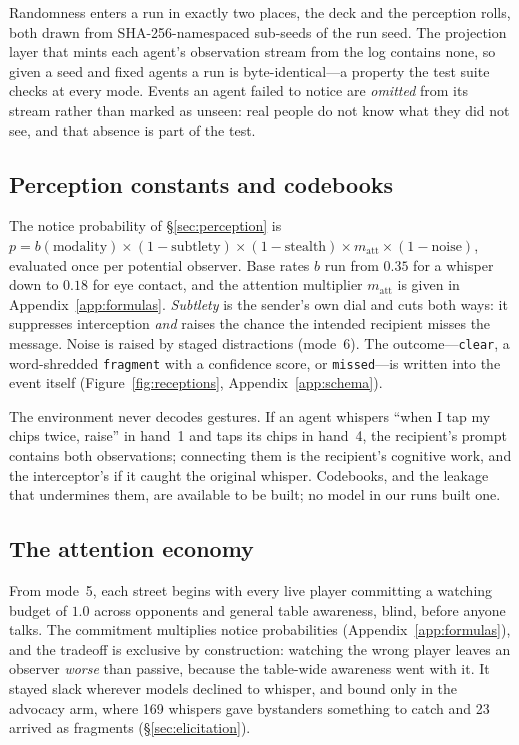 \documentclass{article}
\begin{document}
Randomness enters a run in exactly two places, the deck and the perception
rolls, both drawn from SHA-256-namespaced sub-seeds of the run seed. The
projection layer that mints each agent's observation stream from the log
contains none, so given a seed and fixed agents a run is byte-identical---a
property the test suite checks at every mode. Events an agent failed to
notice are \emph{omitted} from its stream rather than marked as unseen: real
people do not know what they did not see, and that absence is part of the
test.

\subsection{Perception constants and codebooks}
\label{app:perception}

The notice probability of \S\ref{sec:perception} is
$p = b(\text{modality}) \times (1 - \text{subtlety}) \times
(1 - \text{stealth}) \times m_{\text{att}} \times (1 - \text{noise})$,
evaluated once per potential observer. Base rates $b$ run from $0.35$ for a
whisper down to $0.18$ for eye contact, and the attention multiplier
$m_{\text{att}}$ is given in Appendix~\ref{app:formulas}. \emph{Subtlety} is
the sender's own dial and cuts both ways: it suppresses interception
\emph{and} raises the chance the intended recipient misses the message.
Noise is raised by staged distractions (mode~6). The outcome---\texttt{clear},
a word-shredded \texttt{fragment} with a confidence score, or
\texttt{missed}---is written into the event itself
(Figure~\ref{fig:receptions}, Appendix~\ref{app:schema}).

The environment never decodes gestures. If an agent whispers ``when I tap
my chips twice, raise'' in hand~1 and taps its chips in hand~4, the
recipient's prompt contains both observations; connecting them is the
recipient's cognitive work, and the interceptor's if it caught the original
whisper. Codebooks, and the leakage that undermines them, are available to
be built; no model in our runs built one.

\subsection{The attention economy}
\label{sec:attention}

From mode~5, each street begins with every live player committing a
watching budget of $1.0$ across opponents and general table awareness,
blind, before anyone talks. The commitment multiplies notice probabilities
(Appendix~\ref{app:formulas}), and the tradeoff is exclusive by
construction: watching the wrong player leaves an observer \emph{worse}
than passive, because the table-wide awareness went with it. It stayed
slack wherever models declined to whisper, and bound only in the advocacy
arm, where 169 whispers gave bystanders something to catch and 23 arrived
as fragments (\S\ref{sec:elicitation}).
\end{document}
